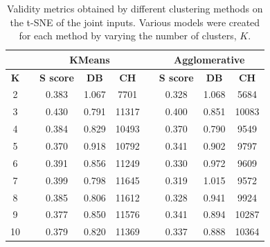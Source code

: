 \begin{table}[]
\caption[Validity metrics for t-SNE of the Joint Inputs]{Validity metrics obtained by different clustering methods on the t-SNE of the joint inputs. Various models were created for each method by varying the number of clusters, $K$.}\label{tab:tsne_joint}
\begin{tabular}{@{}ccccccccc@{}}
\toprule
\multicolumn{1}{l}{\textbf{}} & \multicolumn{1}{l}{\textbf{}} & \multicolumn{3}{c}{\textbf{KMeans}}          & \multicolumn{1}{l}{\textbf{}} & \multicolumn{3}{c}{\textbf{Agglomerative}}   \\ \midrule
\textbf{K}                    & \textbf{}                     & \textbf{S score} & \textbf{DB} & \textbf{CH} & \textbf{}                     & \textbf{S score} & \textbf{DB} & \textbf{CH} \\ \midrule
2                             &                               & 0.383            & 1.067       & 7701        &                               & 0.328            & 1.068       & 5684        \\
3                             &                               & 0.430            & 0.791       & 11317       &                               & 0.400            & 0.851       & 10083       \\
4                             &                               & 0.384            & 0.829       & 10493       &                               & 0.370            & 0.790       & 9549        \\
5                             &                               & 0.370            & 0.918       & 10792       &                               & 0.341            & 0.902       & 9797        \\
6                             &                               & 0.391            & 0.856       & 11249       &                               & 0.330            & 0.972       & 9609        \\
7                             &                               & 0.399            & 0.798       & 11645       &                               & 0.319            & 1.015       & 9572        \\
8                             &                               & 0.385            & 0.806       & 11612       &                               & 0.328            & 0.941       & 9924        \\
9                             &                               & 0.377            & 0.850       & 11576       &                               & 0.341            & 0.894       & 10287       \\
10                            &                               & 0.379            & 0.820       & 11369       &                               & 0.337            & 0.888       & 10364       \\ \bottomrule
\end{tabular}
\end{table}

